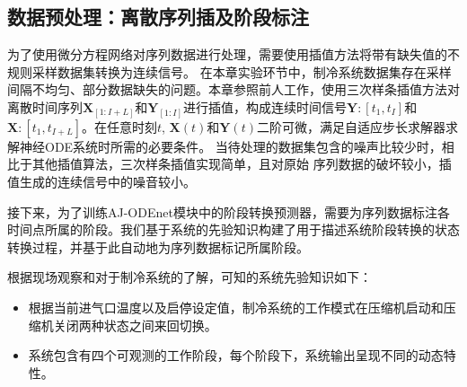 \subsection{数据预处理：离散序列插及阶段标注}

为了使用微分方程网络对序列数据进行处理，需要使用插值方法将带有缺失值的不规则采样数据集转换为连续信号。
在本章实验环节中，制冷系统数据集存在采样间隔不均匀、部分数据缺失的问题。本章参照前人工作\cite{kidger2020neural}，使用三次样条插值方法对离散时间序列$\boldsymbol X_{[1:I+L]}$和$\boldsymbol Y_{[1:I]}$进行插值，构成连续时间信号$\boldsymbol Y:[t_1,t_{I}]$和$\boldsymbol X:[t_1,t_{I+L}]$。在任意时刻$t$,  $\boldsymbol X(t)$和$\boldsymbol Y(t)$二阶可微，满足自适应步长求解器求解神经ODE系统时所需的必要条件\cite{kidger2020neural}。
当待处理的数据集包含的噪声比较少时，相比于其他插值算法，三次样条插值实现简单，且对原始
序列数据的破坏较小，插值生成的连续信号中的噪音较小。

接下来，为了训练AJ-ODEnet模块中的阶段转换预测器，需要为序列数据标注各时间点所属的阶段。我们基于系统的先验知识构建了用于描述系统阶段转换的状态转换过程，并基于此自动地为序列数据标记所属阶段。

根据现场观察和对于制冷系统的了解，可知的系统先验知识如下：
\begin{itemize}
    \item 根据当前进气口温度以及启停设定值，制冷系统的工作模式在压缩机启动和压缩机关闭两种状态之间来回切换。
    \item 系统包含有四个可观测的工作阶段，每个阶段下，系统输出呈现不同的动态特性。
\end{itemize}


